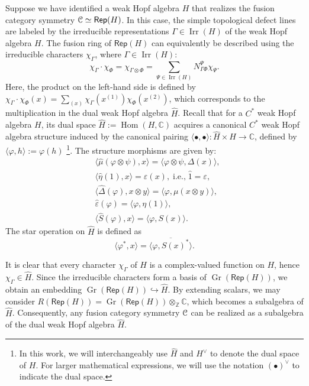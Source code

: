 \documentclass[a4paper,11pt]{article}
\theoremstyle{theorem}
\theoremstyle{remark}
\newcommand\eC           {\EuScript{C}}
\newcommand{\Zbb}{\mathbb{Z}}
\newcommand{\Cbb}{\mathbb{C}}
\newcommand{\Rep}{\mathsf{Rep}}
\newcommand{\cone}{(1)}
\newcommand{\ctwo}{(2)}
\newcommand{\Irr}{\operatorname{Irr}}
\newcommand{\Hom}{\operatorname{Hom}}
\begin{document}
Suppose we have identified a weak Hopf algebra $H$ that realizes the fusion category symmetry $\eC \simeq \Rep(H)$. In this case, the simple topological defect lines are labeled by the irreducible representations $\Gamma\in \Irr(H)$ of the weak Hopf algebra $H$.
The fusion ring of $\Rep(H)$ can equivalently be described using the irreducible characters $\chi_{\Gamma}$, where $\Gamma \in \Irr(H)$:
\begin{equation}
    \chi_{\Gamma} \cdot \chi_{\Phi} = \chi_{\Gamma \otimes \Phi} = \sum_{\Psi \in \Irr(H)} N_{\Gamma \Phi}^{\Psi} \chi_{\Psi}.
\end{equation}
Here, the product on the left-hand side is defined by $\chi_{\Gamma} \cdot \chi_{\Phi}(x) = \sum_{(x)} \chi_{\Gamma}(x^{\cone}) \chi_{\Phi}(x^{\ctwo})$, which corresponds to the multiplication in the dual weak Hopf algebra $\hat{H}$.
Recall that for a $C^*$ weak Hopf algebra $H$, its dual space $\hat{H} := \Hom(H, \mathbb{C})$ acquires a canonical $C^*$ weak Hopf algebra structure induced by the canonical pairing $\langle \bullet, \bullet \rangle: \hat{H} \times H \to \mathbb{C}$, defined by $\langle \varphi, h \rangle := \varphi(h)$ \footnote{In this work, we will interchangeably use $\hat{H}$ and $H^{\vee}$ to denote the dual space of $H$. 
For larger mathematical expressions, we will use the notation $(\bullet)^{\vee}$ to indicate the dual space.}. The structure morphisms are given by:
\begin{align}
& \langle \hat{\mu}(\varphi \otimes \psi), x \rangle = \langle \varphi \otimes \psi, \Delta(x) \rangle, \label{eq:pair1}\\
& \langle \hat{\eta}(1), x \rangle = \varepsilon(x), \; \text{i.e.,} \; \hat{1} = \varepsilon, \\
& \langle \hat{\Delta}(\varphi), x \otimes y \rangle = \langle \varphi, \mu(x \otimes y) \rangle, \label{eq:pairing-psi}\\
& \hat{\varepsilon}(\varphi) = \langle \varphi, \eta(1) \rangle, \\
& \langle \hat{S}(\varphi), x \rangle = \langle \varphi, S(x) \rangle. \label{eq:pair5}
\end{align}
The star operation on $\hat{H}$ is defined as
\begin{equation}
    \langle \varphi^*, x \rangle = \overline{\langle \varphi, S(x)^* \rangle}.
\end{equation}

It is clear that every character $\chi_{\Gamma}$ of $H$ is a complex-valued function on $H$, hence $\chi_{\Gamma}\in\hat{H}$.  
Since the irreducible characters form a basis of $\operatorname{Gr}(\Rep(H))$, we obtain an embedding 
$\operatorname{Gr}(\Rep(H)) \hookrightarrow \hat{H}$.  
By extending scalars, we may consider 
$R(\Rep(H))=\operatorname{Gr}(\Rep(H))\otimes_{\Zbb}\Cbb$, which becomes a subalgebra of $\hat{H}$.  
Consequently, any fusion category symmetry $\eC$ can be realized as a subalgebra of the dual weak Hopf algebra $\hat{H}$.
\end{document}
